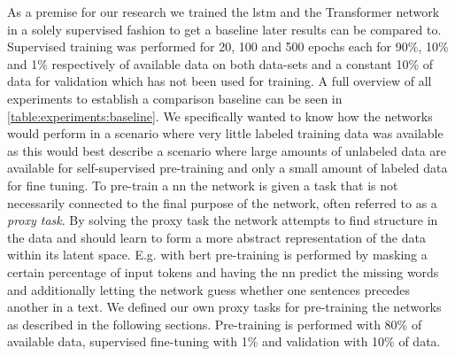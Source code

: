 As a premise for our research we trained the \gls{lstm} and the Transformer network in a solely supervised fashion to get a baseline later results can be compared to. Supervised training was performed for 20, 100 and 500 epochs each for 90\%, 10\% and 1\% respectively of available data on both data-sets and a constant 10\% of data for validation which has not been used for training. A full overview of all experiments to establish a comparison baseline can be seen in \ref{table:experiments:baseline}. We specifically wanted to know how the networks would perform in a scenario where very little labeled training data was available as this would best describe a scenario where large amounts of unlabeled data are available for self-supervised pre-training and only a small amount of labeled data for fine tuning. To pre-train a \gls{nn} the network is given a task that is not necessarily connected to the final purpose of the network, often referred to as a \textit{proxy task}. By solving the proxy task the network attempts to find structure in the data and should learn to form a more abstract representation of the data within its latent space. E.g. with \gls{bert} pre-training is performed by masking a certain percentage of input tokens and having the \gls{nn} predict the missing words and additionally letting the network guess whether one sentences precedes another in a text. We defined our own proxy tasks for pre-training the networks as described in the following sections. Pre-training is performed with 80\% of available data, supervised fine-tuning with 1\% and validation with 10\% of data.

